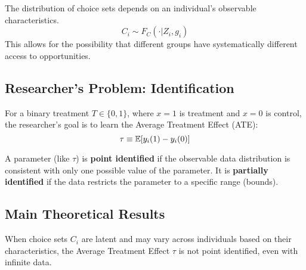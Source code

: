 
\begin{assumption}
The distribution of choice sets depends on an individual's observable characteristics.
\begin{equation}
C_i \sim F_C(\cdot | Z_i, g_i)
\end{equation}
This allows for the possibility that different groups have systematically different access to opportunities.
\end{assumption}

\subsection{Researcher's Problem: Identification}


For a binary treatment $T \in \{0, 1\}$, where $x=1$ is treatment and $x=0$ is control, the researcher's goal is to learn the Average Treatment Effect (ATE):
\begin{equation}
\tau \equiv \mathbb{E}[y_i(1) - y_i(0)]
\end{equation}


\begin{definition}[Identification]
A parameter (like $\tau$) is \textbf{point identified} if the observable data distribution is consistent with only one possible value of the parameter. It is \textbf{partially identified} if the data restricts the parameter to a specific range (bounds).
\end{definition}


\subsection{Main Theoretical Results}

\begin{theorem}\label{thm:non_id}
When choice sets $C_i$ are latent and may vary across individuals based on their characteristics, the Average Treatment Effect $\tau$ is not point identified, even with infinite data.
\end{theorem}

